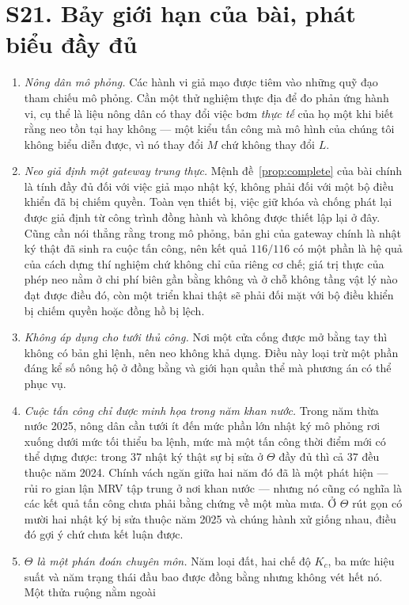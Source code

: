 \section*{S21. Bảy giới hạn của bài, phát biểu đầy đủ}

\begin{enumerate}
\item \emph{Nông dân mô phỏng.} Các hành vi giả mạo được tiêm vào những quỹ đạo tham chiếu mô
phỏng. Cần một thử nghiệm thực địa để đo phản ứng hành vi, cụ thể là liệu nông dân có thay
đổi việc bơm \emph{thực tế} của họ một khi biết rằng neo tồn tại hay không --- một kiểu tấn
công mà mô hình của chúng tôi không biểu diễn được, vì nó thay đổi $M$ chứ không thay đổi $L$.
\item \emph{Neo giả định một gateway trung thực.} Mệnh đề~\ref{prop:complete} của bài chính là
tính đầy đủ đối với việc giả mạo nhật ký, không phải đối với một bộ điều khiển đã bị chiếm
quyền. Toàn vẹn thiết bị, việc giữ khóa và chống phát lại được giả định từ công trình đồng
hành và không được thiết lập lại ở đây. Cũng cần nói thẳng rằng trong mô phỏng, bản ghi của
gateway chính là nhật ký thật đã sinh ra cuộc tấn công, nên kết quả $116/116$ có một phần là
hệ quả của cách dựng thí nghiệm chứ không chỉ của riêng cơ chế; giá trị thực của phép neo nằm
ở chi phí biên gần bằng không và ở chỗ không tầng vật lý nào đạt được điều đó, còn một triển
khai thật sẽ phải đối mặt với bộ điều khiển bị chiếm quyền hoặc đồng hồ bị lệch.
\item \emph{Không áp dụng cho tưới thủ công.} Nơi một cửa cống được mở bằng tay thì không có
bản ghi lệnh, nên neo không khả dụng. Điều này loại trừ một phần đáng kể số nông hộ ở đồng
bằng và giới hạn quần thể mà phương án có thể phục vụ.
\item \emph{Cuộc tấn công chỉ được minh họa trong năm khan nước.} Trong năm thừa nước 2025,
nông dân cần tưới ít đến mức phần lớn nhật ký mô phỏng rơi xuống dưới mức tối thiểu ba lệnh,
mức mà một tấn công thời điểm mới có thể dựng được: trong $37$ nhật ký thật sự bị sửa ở
$\Theta$ đầy đủ thì cả $37$ đều thuộc năm 2024. Chính vách ngăn giữa hai năm đó đã là một
phát hiện --- rủi ro gian lận MRV tập trung ở nơi khan nước --- nhưng nó cũng có nghĩa là các
kết quả tấn công chưa phải bằng chứng về một mùa mưa. Ở $\Theta$ rút gọn có mười hai nhật ký
bị sửa thuộc năm 2025 và chúng hành xử giống nhau, điều đó gợi ý chứ chưa kết luận được.
\item \emph{$\Theta$ là một phán đoán chuyên môn.} Năm loại đất, hai chế độ $K_c$, ba mức hiệu
suất và năm trạng thái đầu bao được đồng bằng nhưng không vét hết nó. Một thửa ruộng nằm ngoài

\end{enumerate}

